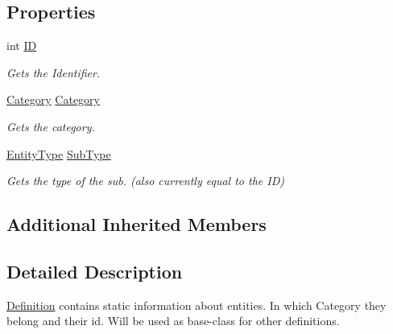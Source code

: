 \subsection*{Properties}
\begin{DoxyCompactItemize}
\item 
int \hyperlink{classCore_1_1Models_1_1Definitions_1_1Definition_a6504fe4404e24c0b0601b0591f99fda4}{I\+D}
\begin{DoxyCompactList}\small\item\em Gets the Identifier. \end{DoxyCompactList}\item 
\hyperlink{namespaceCore_1_1Models_1_1Definitions_a8be0403c3e883fe583d7bb3893c22c65}{Category} \hyperlink{classCore_1_1Models_1_1Definitions_1_1Definition_abbcf001ffb2d8453d321e3524739b48e}{Category}
\begin{DoxyCompactList}\small\item\em Gets the category. \end{DoxyCompactList}\item 
\hyperlink{namespaceCore_1_1Models_1_1Definitions_a609ed13db028308ebc6c5fbd98615fdc}{Entity\+Type} \hyperlink{classCore_1_1Models_1_1Definitions_1_1Definition_ae71f596d97485f31733d1b9b5144051a}{Sub\+Type}
\begin{DoxyCompactList}\small\item\em Gets the type of the sub. (also currently equal to the I\+D) \end{DoxyCompactList}\end{DoxyCompactItemize}
\subsection*{Additional Inherited Members}


\subsection{Detailed Description}
\hyperlink{classCore_1_1Models_1_1Definitions_1_1Definition}{Definition} contains static information about entities. In which Category they belong and their id. Will be used as base-\/class for other definitions. 



